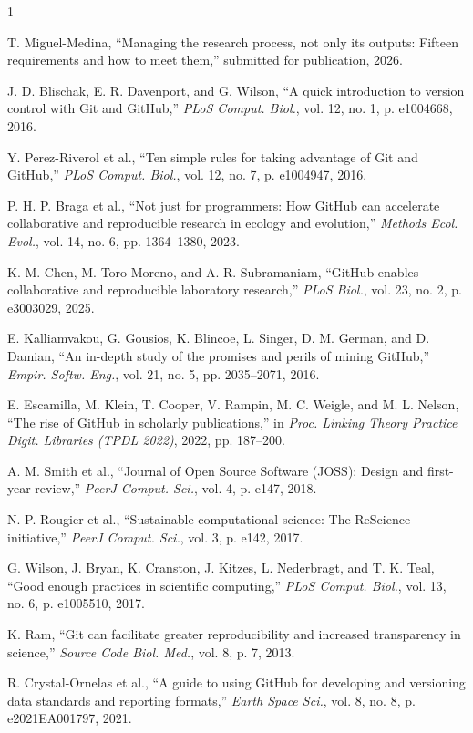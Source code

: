 \documentclass{IEEEcsmag}
\begin{document}
\begin{thebibliography}{1}

T. Miguel-Medina, ``Managing the research process, not only its outputs: Fifteen requirements and how to meet them,'' submitted for publication, 2026.

J. D. Blischak, E. R. Davenport, and G. Wilson, ``A quick introduction to version control with Git and GitHub,'' {\it PLoS Comput. Biol.}, vol. 12, no. 1, p. e1004668, 2016.

Y. Perez-Riverol et al., ``Ten simple rules for taking advantage of Git and GitHub,'' {\it PLoS Comput. Biol.}, vol. 12, no. 7, p. e1004947, 2016.

P. H. P. Braga et al., ``Not just for programmers: How GitHub can accelerate collaborative and reproducible research in ecology and evolution,'' {\it Methods Ecol. Evol.}, vol. 14, no. 6, pp. 1364--1380, 2023.

K. M. Chen, M. Toro-Moreno, and A. R. Subramaniam, ``GitHub enables collaborative and reproducible laboratory research,'' {\it PLoS Biol.}, vol. 23, no. 2, p. e3003029, 2025.

E. Kalliamvakou, G. Gousios, K. Blincoe, L. Singer, D. M. German, and D. Damian, ``An in-depth study of the promises and perils of mining GitHub,'' {\it Empir. Softw. Eng.}, vol. 21, no. 5, pp. 2035--2071, 2016.

E. Escamilla, M. Klein, T. Cooper, V. Rampin, M. C. Weigle, and M. L. Nelson, ``The rise of GitHub in scholarly publications,'' in {\it Proc. Linking Theory Practice Digit. Libraries (TPDL 2022)}, 2022, pp. 187--200.

A. M. Smith et al., ``Journal of Open Source Software (JOSS): Design and first-year review,'' {\it PeerJ Comput. Sci.}, vol. 4, p. e147, 2018.

N. P. Rougier et al., ``Sustainable computational science: The ReScience initiative,'' {\it PeerJ Comput. Sci.}, vol. 3, p. e142, 2017.

G. Wilson, J. Bryan, K. Cranston, J. Kitzes, L. Nederbragt, and T. K. Teal, ``Good enough practices in scientific computing,'' {\it PLoS Comput. Biol.}, vol. 13, no. 6, p. e1005510, 2017.

K. Ram, ``Git can facilitate greater reproducibility and increased transparency in science,'' {\it Source Code Biol. Med.}, vol. 8, p. 7, 2013.

R. Crystal-Ornelas et al., ``A guide to using GitHub for developing and versioning data standards and reporting formats,'' {\it Earth Space Sci.}, vol. 8, no. 8, p. e2021EA001797, 2021.

\end{thebibliography}
\end{document}
